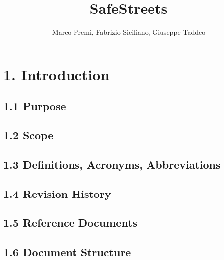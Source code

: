 \documentclass{report}
\title{SafeStreets}
\author{Marco Premi, Fabrizio Siciliano, Giuseppe Taddeo}
\begin{document}
\maketitle



\section*{1. Introduction}
    \subsection*{1.1 Purpose}
    \subsection*{1.2 Scope}
    \subsection*{1.3 Definitions, Acronyms, Abbreviations}
    \subsection*{1.4 Revision History}
    \subsection*{1.5 Reference Documents}
    \subsection*{1.6 Document Structure}
    
\end{document}
